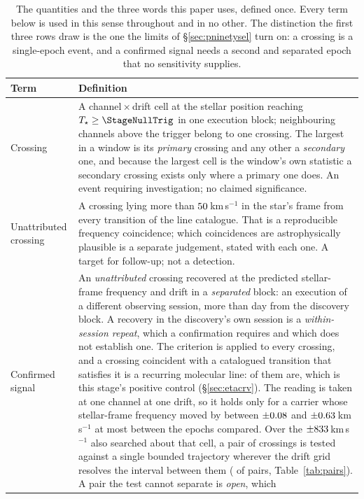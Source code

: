 \begin{table}
\centering
\caption{The quantities and the three words this paper uses, defined once.
Every term below is used in this sense throughout and in no other. The
distinction the first three rows draw is the one the limits of
\S\ref{sec:pninetysel} turn on: a crossing is a single-epoch event, and a
confirmed signal needs a second and separated epoch that no sensitivity
supplies.}
\label{tab:quantities}
\small
\begin{tabular}{@{}p{}p{}@{}}
\hline
Term & Definition \\
\hline
Crossing &
A channel\,$\times$\,drift cell at the stellar position reaching
$T_\star\geq\StageNullTrig$ in one execution block; neighbouring channels
above the trigger belong to one crossing. The largest in a window is its
\emph{primary} crossing and any other a \emph{secondary} one, and because the
largest cell is the window's own statistic a secondary crossing exists only
where a primary one does. An event requiring investigation; no claimed
significance. \\
Unattributed crossing &
A crossing lying more than $50$\,km\,s$^{-1}$ in the star's frame
from every transition of the line catalogue. That is a reproducible frequency
coincidence; which coincidences are astrophysically plausible is a separate
judgement, stated with each one. A target for follow-up; not a detection. \\
Confirmed signal &
An \emph{unattributed} crossing recovered at the predicted stellar-frame
frequency and drift in a \emph{separated} block: an execution of a different
observing session, more than \EpSep{} day from the discovery block. A
recovery in the discovery's own session is a \emph{within-session repeat},
which a confirmation requires and which does not establish one. The criterion is
applied to every crossing, and a crossing coincident with a catalogued
transition that satisfies it is a recurring molecular line:
\MkAttrRecur{} of them are, which is this stage's positive control
(\S\ref{sec:etacrv}). The reading is taken at one channel at one drift, so it holds only for a
carrier whose stellar-frame frequency moved by between $\pm0.08$ and
$\pm0.63$\,km\,s$^{-1}$ at most between the epochs compared. Over the
$\pm833$\,km\,s$^{-1}$ also searched about that cell, a pair of
crossings is tested against a single bounded trajectory wherever the drift
grid resolves the interval between them (\TjNPower{} of \TjNPair{} pairs,
Table~\ref{tab:pairs}). A pair the test cannot separate is \emph{open}, which

\end{tabular}
\end{table}
